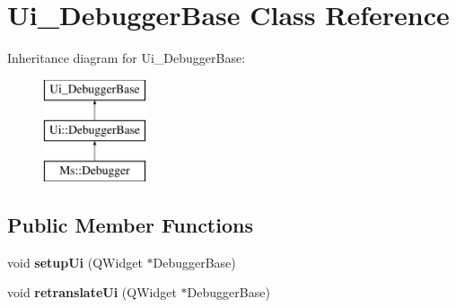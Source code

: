 \hypertarget{class_ui___debugger_base}{}\section{Ui\+\_\+\+Debugger\+Base Class Reference}
\label{class_ui___debugger_base}
Inheritance diagram for Ui\+\_\+\+Debugger\+Base\+:\begin{figure}[H]
\begin{center}
\leavevmode
\includegraphics[height=3.000000cm]{class_ui___debugger_base}
\end{center}
\end{figure}
\subsection*{Public Member Functions}
\begin{DoxyCompactItemize}
\item 
\mbox{\label{class_ui___debugger_base_a9b1a50fe2b138ffe688392cf9d1ddf1b}} 
void {\bfseries setup\+Ui} (Q\+Widget $\ast$Debugger\+Base)
\item 
\mbox{\label{class_ui___debugger_base_a4b57069c73849012f612572b83e1fe54}} 
void {\bfseries retranslate\+Ui} (Q\+Widget $\ast$Debugger\+Base)
\end{DoxyCompactItemize}
